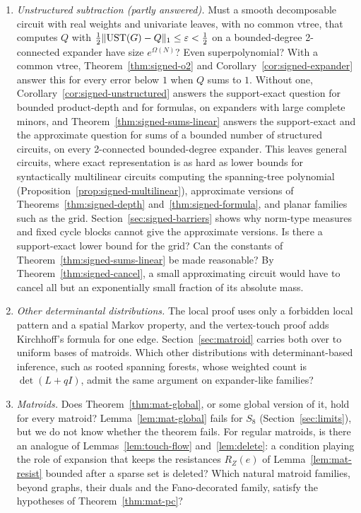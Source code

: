 \begin{enumerate}
\item \emph{Unstructured subtraction (partly answered).} Must a smooth decomposable circuit with real weights and univariate leaves, with no common vtree, that computes $Q$ with $\frac12\lVert \mathrm{UST}(G)-Q\rVert_1\le\varepsilon<\frac12$ on a bounded-degree 2-connected expander have size $e^{\Omega(N)}$? Even superpolynomial? With a common vtree, Theorem~\ref{thm:signed-o2} and Corollary~\ref{cor:signed-expander} answer this for every error below $1$ when $Q$ sums to $1$. Without one, Corollary~\ref{cor:signed-unstructured} answers the support-exact question for bounded product-depth and for formulas, on expanders with large complete minors, and Theorem~\ref{thm:signed-sums-linear} answers the support-exact and the approximate question for sums of a bounded number of structured circuits, on every 2-connected bounded-degree expander. This leaves general circuits, where exact representation is as hard as lower bounds for syntactically multilinear circuits computing the spanning-tree polynomial (Proposition~\ref{prop:signed-multilinear}), approximate versions of Theorems~\ref{thm:signed-depth} and~\ref{thm:signed-formula}, and planar families such as the grid. Section~\ref{sec:signed-barriers} shows why norm-type measures and fixed cycle blocks cannot give the approximate versions. Is there a support-exact lower bound for the grid? Can the constants of Theorem~\ref{thm:signed-sums-linear} be made reasonable? By Theorem~\ref{thm:signed-cancel}, a small approximating circuit would have to cancel all but an exponentially small fraction of its absolute mass.

\item \emph{Other determinantal distributions.} The local proof uses only a forbidden local pattern and a spatial Markov property, and the vertex-touch proof adds Kirchhoff's formula for one edge. Section~\ref{sec:matroid} carries both over to uniform bases of matroids. Which other distributions with determinant-based inference, such as rooted spanning forests, whose weighted count is $\det(L+qI)$, admit the same argument on expander-like families?

\item \emph{Matroids.} Does Theorem~\ref{thm:mat-global}, or some global version of it, hold for every matroid? Lemma~\ref{lem:mat-global} fails for $S_8$ (Section~\ref{sec:limits}), but we do not know whether the theorem fails. For regular matroids, is there an analogue of Lemmas~\ref{lem:touch-flow} and~\ref{lem:delete}: a condition playing the role of expansion that keeps the resistances $R_Z(e)$ of Lemma~\ref{lem:mat-resist} bounded after a sparse set is deleted? Which natural matroid families, beyond graphs, their duals and the Fano-decorated family, satisfy the hypotheses of Theorem~\ref{thm:mat-pc}?
\end{enumerate}

